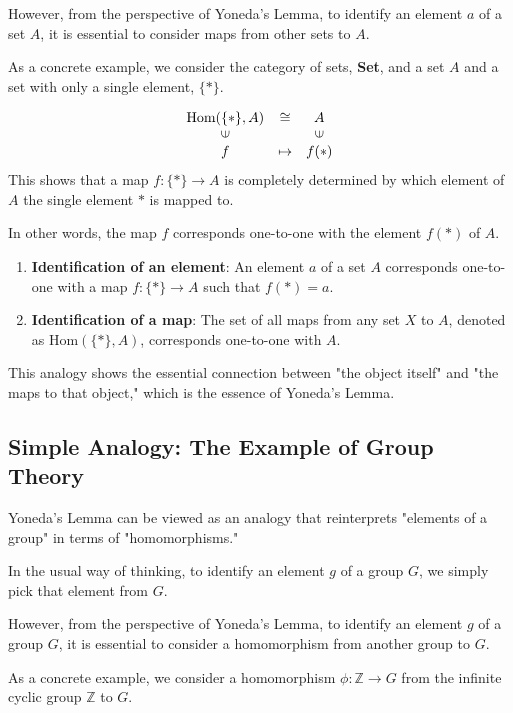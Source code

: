 \documentclass[uplatex,a4j,12pt,dvipdfmx]{jsarticle}
\begin{document}
However, from the perspective of Yoneda's Lemma, to identify an element $a$ of a set $A$, it is essential to consider maps from other sets to $A$.

As a concrete example, we consider the category of sets, \textbf{Set}, and a set $A$ and a set with only a single element, $\{*\}$.

\[
	\begin{array}{ccc} \text{Hom}(\{*\}, A)& \cong & A \\ \rotatebox{90}{${\in}$} && \rotatebox{90}{${\in}$} \\ f& \mapsto & f(*) \end{array}
\]
This shows that a map $f: \{*\} \to A$ is completely determined by which element of $A$ the single element $*$ is mapped to.

In other words, the map $f$ corresponds one-to-one with the element $f(*)$ of $A$.

\begin{enumerate}
	\item \textbf{Identification of an element}: An element $a$ of a set $A$ corresponds one-to-one with a map $f: \{*\} \to A$ such that $f(*) = a$.
	\item \textbf{Identification of a map}: The set of all maps from any set $X$ to $A$, denoted as $\text{Hom}(\{*\}, A)$, corresponds one-to-one with $A$.
\end{enumerate}

This analogy shows the essential connection between "the object itself" and "the maps to that object," which is the essence of Yoneda's Lemma.





\subsection{Simple Analogy: The Example of Group Theory}

Yoneda's Lemma can be viewed as an analogy that reinterprets "elements of a group" in terms of "homomorphisms."

In the usual way of thinking, to identify an element $g$ of a group $G$, we simply pick that element from $G$.

However, from the perspective of Yoneda's Lemma, to identify an element $g$ of a group $G$, it is essential to consider a homomorphism from another group to $G$.

As a concrete example, we consider a homomorphism $\phi: \mathbb{Z} \to G$ from the infinite cyclic group $\mathbb{Z}$ to $G$.
\end{document}
